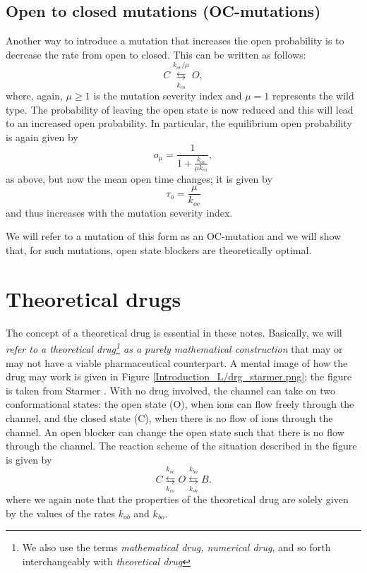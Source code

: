 \subsection{Open to closed mutations (OC-mutations)}
Another way to introduce a mutation that increases the open probability is to decrease the rate from open to closed. This can be written as follows:
\begin{equation}
C\underset{ k_{co}}{\overset{k_{oc}/\mu}{\leftrightarrows}}O,
\end{equation}
where, again, $\mu \ge 1$ is the mutation severity index and $\mu=1$ represents the wild type. The probability of leaving the open state is now reduced and this will lead to an increased open probability.
In particular, the equilibrium open probability is again given by
\[ o_\mu=\frac{1}{1+\frac{k_{oc}}{\mu k_{co}}}, \]
as above, but now the mean open time changes; it is given by
\[ \tau_o=\frac{\mu}{k_{oc}}\]
and thus increases with the mutation severity index.

We will refer to a mutation of this form as an OC-mutation and we will show that, for such mutations, open state blockers are theoretically optimal.

\section{Theoretical drugs \label{theoreticaldrugs}}

The concept of a theoretical drug is essential in these notes. Basically, we will {\em  refer to a theoretical drug\footnote{We also use the terms \textit{mathematical drug, numerical drug}, and so forth interchangeably with \textit{theoretical drug}} as a purely mathematical construction} that may or may not have a viable pharmaceutical counterpart. A mental image of how the drug may work is given in Figure \ref{Introduction_L/drg_starmer.png}; the figure is taken from Starmer \cite{Starmer2002}. With no drug involved, the channel can take on two conformational states: the open state (O), when ions can flow freely through the channel, and the closed state (C), when there is no flow of ions through the channel. An open blocker can change the open state such that there is no flow through the channel. The reaction scheme of the situation described in the figure is given by
\begin{equation}
C\underset{ k_{co}}{\overset{k_{oc}}{\leftrightarrows}}O\underset{k_{ob}%
}{\overset{k_{bo}}{\leftrightarrows}}B. \label{closed_block201}
\end{equation} where we again note that the properties of the theoretical drug are solely given by the values of the rates $k_{ob}$ and $k_{bo}$. 

